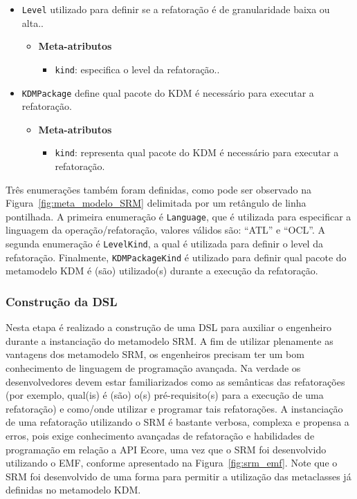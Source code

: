 \begin{itemize}
\item \texttt{Level} utilizado para definir se a refatoração é de granularidade baixa ou alta..

\begin{itemize}
	\item \textbf{Meta-atributos}
		\begin{itemize}
			\item \texttt{kind}: especifica o level da refatoração..
		\end{itemize}	
\end{itemize} 

\item \texttt{KDMPackage} define qual pacote do KDM é necessário para executar a refatoração.

\begin{itemize}
	\item \textbf{Meta-atributos}
		\begin{itemize}
			\item \texttt{kind}: representa qual pacote do KDM é necessário para executar a refatoração.
		\end{itemize}	
\end{itemize} 

\end{itemize}

Três enumerações também foram definidas, como pode ser observado na Figura~\ref{fig:meta_modelo_SRM} delimitada por um retângulo de linha pontilhada. A primeira enumeração é \texttt{Language}, que é utilizada para especificar a linguagem da operação/refatoração, valores válidos são: ``ATL'' e ``OCL''. A segunda enumeração é \texttt{LevelKind}, a qual é utilizada para definir o level da refatoração. Finalmente, \texttt{KDMPackageKind} é utilizado para definir qual pacote do metamodelo KDM é (são) utilizado(s) durante a execução da refatoração. 



\subsubsection{Construção da DSL}

Nesta etapa é realizado a construção de uma DSL para auxiliar o engenheiro durante a instanciação do metamodelo SRM. A fim de utilizar plenamente as vantagens dos metamodelo SRM, os engenheiros precisam ter um bom conhecimento de linguagem de programação avançada. Na verdade os desenvolvedores devem estar familiarizados como as semânticas das refatorações (por exemplo, qual(is) é (são) o(s) pré-requisito(s) para a execução de uma refatoração) e como/onde utilizar e programar tais refatorações. A instanciação de uma refatoração utilizando o SRM é bastante verbosa, complexa e propensa a erros, pois exige conhecimento  avançadas de refatoração e habilidades de programação em relação a API Ecore, uma vez que o SRM foi desenvolvido utilizando o EMF, conforme apresentado na Figura~\ref{fig:srm_emf}. Note que o SRM foi desenvolvido de uma forma para permitir a utilização das metaclasses já definidas no metamodelo KDM.

